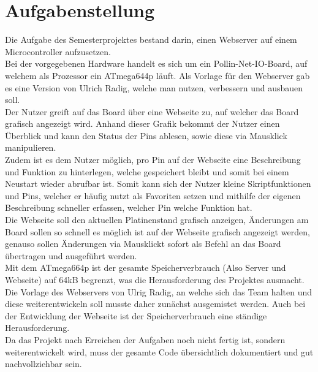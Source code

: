 \chapter{Aufgabenstellung}

Die Aufgabe des Semesterprojektes bestand darin, einen Webserver auf einem Microcontroller aufzusetzen.\\
Bei der vorgegebenen Hardware handelt es sich um ein Pollin-Net-IO-Board, auf welchem als Prozessor ein ATmega644p 
läuft. Als Vorlage für den Webserver gab es eine Version von Ulrich Radig, welche man nutzen, verbessern und ausbauen soll.\\
Der Nutzer greift auf das Board über eine Webseite zu, auf welcher das Board grafisch angezeigt wird. Anhand dieser Grafik 
bekommt der Nutzer einen Überblick und kann den Status der Pins ablesen, sowie diese via Mausklick manipulieren.\\
Zudem ist es dem Nutzer möglich, pro Pin auf der Webseite eine Beschreibung und Funktion zu 
hinterlegen, welche gespeichert bleibt und somit bei einem Neustart wieder abrufbar ist. Somit kann sich der Nutzer kleine Skriptfunktionen und Pins, 
welcher er häufig nutzt als Favoriten setzen und mithilfe der eigenen Beschreibung schneller erfassen, welcher Pin welche Funktion hat.\\
Die Webseite soll den aktuellen Platinenstand grafisch anzeigen, Änderungen am Board sollen so 
schnell es möglich ist auf der Webseite grafisch angezeigt werden, genauso sollen Änderungen via Mausklickt sofort als Befehl 
an das Board übertragen und ausgeführt werden.\\
Mit dem ATmega664p ist der gesamte Speicherverbrauch (Also Server und Webseite) auf 64kB begrenzt, was die Herausforderung des  
Projektes ausmacht. Die Vorlage des Webservers von Ulrig Radig, an welche sich das Team halten und diese weiterentwickeln soll 
musste daher zunächst ausgemistet werden. Auch bei der Entwicklung der Webseite ist der Speicherverbrauch eine ständige Herausforderung.\\
Da das Projekt nach Erreichen der Aufgaben noch nicht fertig ist, sondern weiterentwickelt wird, muss der gesamte Code übersichtlich 
dokumentiert und gut nachvollziehbar sein.
